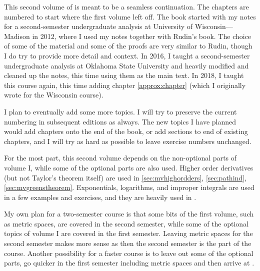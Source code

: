 
This second volume of  is meant to
be a seamless continuation.  The chapters are numbered to start where the
first volume left off.  The book started with my notes for a second-semester
undergraduate analysis at University of Wisconsin---Madison in 2012, where I
used my notes together with Rudin's book.  The choice of some of the
material and some of the proofs are very similar to Rudin, though I do try
to provide more detail and context.
In 2016, I taught a second-semester
undergraduate analysis at Oklahoma State University and heavily
modified and cleaned up the notes, this time using them as the main text.
In 2018, I taught this course again, this time adding chapter
\ref{approx:chapter} (which I originally wrote for the Wisconsin course).

I plan to eventually add some more topics.
I will try to
preserve the current numbering in subsequent editions as always.  The new
topics I have planned would add chapters onto the end of the
book, or add sections to end of existing chapters, and I will try as hard as
possible to leave exercise numbers unchanged.

For the most part, this second volume
depends on the non-optional parts of volume I\@,
while some of the optional parts are also used.
Higher order derivatives (but not Taylor's theorem
itself) are used
in \ref{sec:mvhighordders}, \ref{sec:pathind},
\ref{sec:mvgreenstheorem}.  Exponentials, logarithms, and improper integrals are
used in a few examples and exercises, and they are heavily used in
.

My own plan for a
two-semester course is that some bits of the
first volume, such as metric spaces, are
covered in the second semester, while some of the optional topics of volume
I are covered in the first semester.  Leaving metric spaces for the second
semester makes more sense as then the second
semester is the  part of the course.
Another possibility for a faster course
is to leave out some of the optional parts, go quicker in the first semester
including metric spaces and then arrive at .

